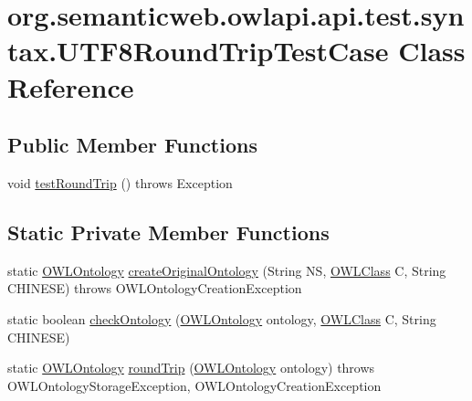 \hypertarget{classorg_1_1semanticweb_1_1owlapi_1_1api_1_1test_1_1syntax_1_1_u_t_f8_round_trip_test_case}{\section{org.\-semanticweb.\-owlapi.\-api.\-test.\-syntax.\-U\-T\-F8\-Round\-Trip\-Test\-Case Class Reference}
\label{classorg_1_1semanticweb_1_1owlapi_1_1api_1_1test_1_1syntax_1_1_u_t_f8_round_trip_test_case}
}
\subsection*{Public Member Functions}
\begin{DoxyCompactItemize}
\item 
void \hyperlink{classorg_1_1semanticweb_1_1owlapi_1_1api_1_1test_1_1syntax_1_1_u_t_f8_round_trip_test_case_add0bf92e2bdbb3bd62d59c8dd6e27360}{test\-Round\-Trip} ()  throws Exception 
\end{DoxyCompactItemize}
\subsection*{Static Private Member Functions}
\begin{DoxyCompactItemize}
\item 
static \hyperlink{interfaceorg_1_1semanticweb_1_1owlapi_1_1model_1_1_o_w_l_ontology}{O\-W\-L\-Ontology} \hyperlink{classorg_1_1semanticweb_1_1owlapi_1_1api_1_1test_1_1syntax_1_1_u_t_f8_round_trip_test_case_a43f4c2c9b5d086680acee45169319393}{create\-Original\-Ontology} (String N\-S, \hyperlink{interfaceorg_1_1semanticweb_1_1owlapi_1_1model_1_1_o_w_l_class}{O\-W\-L\-Class} C, String C\-H\-I\-N\-E\-S\-E)  throws O\-W\-L\-Ontology\-Creation\-Exception 
\item 
static boolean \hyperlink{classorg_1_1semanticweb_1_1owlapi_1_1api_1_1test_1_1syntax_1_1_u_t_f8_round_trip_test_case_a9d6cd24ae4aab45b743d25f57474c68f}{check\-Ontology} (\hyperlink{interfaceorg_1_1semanticweb_1_1owlapi_1_1model_1_1_o_w_l_ontology}{O\-W\-L\-Ontology} ontology, \hyperlink{interfaceorg_1_1semanticweb_1_1owlapi_1_1model_1_1_o_w_l_class}{O\-W\-L\-Class} C, String C\-H\-I\-N\-E\-S\-E)
\item 
static \hyperlink{interfaceorg_1_1semanticweb_1_1owlapi_1_1model_1_1_o_w_l_ontology}{O\-W\-L\-Ontology} \hyperlink{classorg_1_1semanticweb_1_1owlapi_1_1api_1_1test_1_1syntax_1_1_u_t_f8_round_trip_test_case_a84104185c9cda5dbaed5a5b3ff482368}{round\-Trip} (\hyperlink{interfaceorg_1_1semanticweb_1_1owlapi_1_1model_1_1_o_w_l_ontology}{O\-W\-L\-Ontology} ontology)  throws O\-W\-L\-Ontology\-Storage\-Exception, O\-W\-L\-Ontology\-Creation\-Exception 
\end{DoxyCompactItemize}



